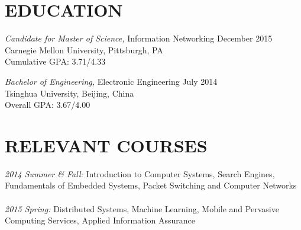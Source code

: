 \documentclass[margin, 10pt]{res} %
\begin{document}
\begin{resume}





\section{EDUCATION}
{\sl Candidate for Master of Science,} Information Networking \hfill December 2015 \\
Carnegie Mellon University, Pittsburgh, PA \\
Cumulative GPA: 3.71/4.33 

{\sl Bachelor of Engineering,} Electronic Engineering \hfill July 2014 \\
Tsinghua University, Beijing, China \\
Overall GPA: 3.67/4.00 

\section{RELEVANT COURSES}
{\sl 2014 Summer \& Fall:} Introduction to Computer Systems, Search Engines, Fundamentals of Embedded Systems, Packet Switching and Computer Networks \\ \\
{\sl 2015 Spring:} Distributed Systems, Machine Learning, Mobile and Pervasive Computing Services, Applied Information Assurance


\end{resume}
\end{document}
